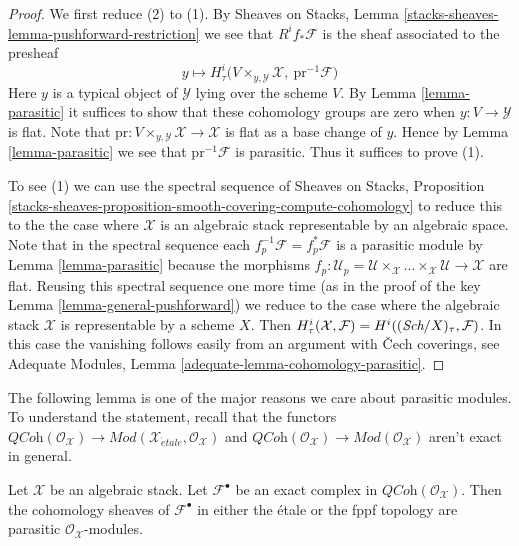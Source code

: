 \begin{proof}
We first reduce (2) to (1).
By Sheaves on Stacks, Lemma \ref{stacks-sheaves-lemma-pushforward-restriction}
we see that $R^if_*\mathcal{F}$ is the sheaf associated to the presheaf
$$
y \longmapsto
H^i_\tau\Big(V \times_{y, \mathcal{Y}} \mathcal{X},
\ \text{pr}^{-1}\mathcal{F}\Big)
$$
Here $y$ is a typical object of $\mathcal{Y}$ lying over the scheme $V$.
By Lemma \ref{lemma-parasitic} it suffices to show that
these cohomology groups are zero when $y : V \to \mathcal{Y}$ is flat.
Note that $\text{pr} : V \times_{y, \mathcal{Y}} \mathcal{X} \to \mathcal{X}$
is flat as a base change of $y$. Hence by
Lemma \ref{lemma-parasitic} we see that $\text{pr}^{-1}\mathcal{F}$
is parasitic. Thus it suffices to prove (1).

\medskip\noindent
To see (1) we can use the spectral sequence of
Sheaves on Stacks, Proposition
\ref{stacks-sheaves-proposition-smooth-covering-compute-cohomology}
to reduce this to the the case where $\mathcal{X}$
is an algebraic stack representable by an algebraic space.
Note that in the spectral sequence each
$f_p^{-1}\mathcal{F} = f_p^*\mathcal{F}$ is a parasitic module by
Lemma \ref{lemma-parasitic} because the morphisms
$f_p : \mathcal{U}_p =
\mathcal{U} \times_\mathcal{X} \ldots
\times_\mathcal{X} \mathcal{U} \to \mathcal{X}$ are flat.
Reusing this spectral sequence one more time (as in the
proof of the key Lemma \ref{lemma-general-pushforward})
we reduce to the case where the
algebraic stack $\mathcal{X}$ is representable by a scheme $X$.
Then $H^i_\tau(\mathcal{X}, \mathcal{F}) = H^i((\textit{Sch}/X)_\tau, \mathcal{F})$.
In this case the vanishing follows easily from an argument
with {\v C}ech coverings, see
Adequate Modules, Lemma \ref{adequate-lemma-cohomology-parasitic}.
\end{proof}

\noindent
The following lemma is one of the major reasons we care about
parasitic modules. To understand the statement, recall that
the functors
$\textit{QCoh}(\mathcal{O}_\mathcal{X}) \to
\textit{Mod}(\mathcal{X}_{\acute{e}tale}, \mathcal{O}_\mathcal{X})$
and
$\textit{QCoh}(\mathcal{O}_\mathcal{X}) \to
\textit{Mod}(\mathcal{O}_\mathcal{X})$
aren't exact in general.

\begin{lemma}
\label{lemma-exact-sequence-quasi-coherent-parasitic-cohomology}
Let $\mathcal{X}$ be an algebraic stack. Let
$\mathcal{F}^\bullet$ be an
exact complex in $\textit{QCoh}(\mathcal{O}_\mathcal{X})$.
Then the cohomology sheaves of $\mathcal{F}^\bullet$
in either the \'etale or the fppf topology
are parasitic $\mathcal{O}_\mathcal{X}$-modules.
\end{lemma}

